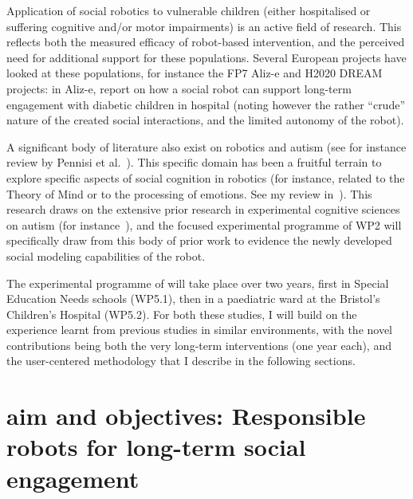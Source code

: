 Application of social robotics to vulnerable children (either hospitalised or
suffering cognitive and/or motor impairments) is an active field of research.
This reflects both the measured efficacy of robot-based intervention, and the
perceived need for additional support for these populations.  Several European
projects have looked at these populations, for instance the FP7 Aliz-e and H2020
DREAM projects: in Aliz-e, \cite{baxter2011long,coninx2016towards} report on how
a social robot can support long-term engagement with diabetic children in
hospital (noting however the rather ``crude'' nature of the created social
interactions, and the limited autonomy of the robot).

A significant body of literature also exist on robotics and autism (see for
instance review by Pennisi et al.~\cite{pennisi2016autism}). This specific
domain has been a fruitful terrain to explore specific aspects of social
cognition in robotics (for instance, related to the Theory of Mind or to the
processing of emotions. See my review in~\cite{lemaignan2015mutual}). This
research draws on the extensive prior research in experimental cognitive
sciences on autism (for instance~\cite{baron1985does, frith1994autism}), and the
focused experimental programme of WP2 will specifically draw from this body of
prior work to evidence the newly developed social modeling capabilities of the
robot.

The experimental programme of \project will take place over two years, first in
Special Education Needs schools (WP5.1), then in a paediatric ward at the
Bristol's Children's Hospital (WP5.2). For both these studies, I will build on
the experience learnt from previous studies in similar environments, with the
novel contributions being both the very long-term interventions (one year each),
and the user-centered methodology that I describe in the following sections.






\section{\project aim and objectives: Responsible robots for long-term social engagement}

